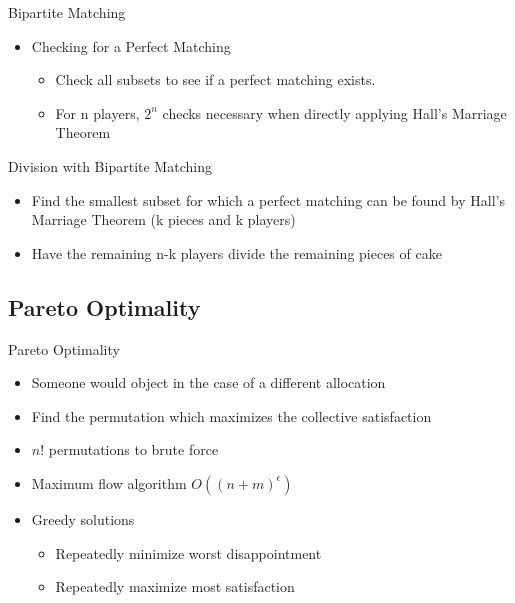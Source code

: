 \documentclass[aspectratio=169,xcolor=dvipsnames]{beamer}
\begin{document}
\begin{frame}{Bipartite Matching}
	\begin{itemize}
		\item Checking for a Perfect Matching
		\begin{itemize}
			\item Check all subsets to see if a perfect matching exists.
			\item For n players, $2^n$ checks necessary when directly applying Hall's Marriage Theorem
		\end{itemize}
	\end{itemize}
\end{frame}
\begin{frame}{Division with Bipartite Matching}
	\begin{itemize}
		\item Find the smallest subset for which a perfect matching can be found by Hall's Marriage Theorem (k pieces and k players)
		\item Have the remaining n-k players divide the remaining pieces of cake
	\end{itemize}
\end{frame}
\subsection{Pareto Optimality}
\begin{frame}{Pareto Optimality}
	\begin{itemize}
		\item Someone would object in the case of a different allocation\pause
		\item Find the permutation which maximizes the collective satisfaction
		\item $n!$ permutations to brute force
		\item Maximum flow algorithm $O((n+m)^\epsilon)$ \pause
		\item Greedy solutions\pause
		\begin{itemize}
			\item Repeatedly minimize worst disappointment
			\item Repeatedly maximize most satisfaction
		\end{itemize}
		
	\end{itemize}
\end{frame}
\end{document}
